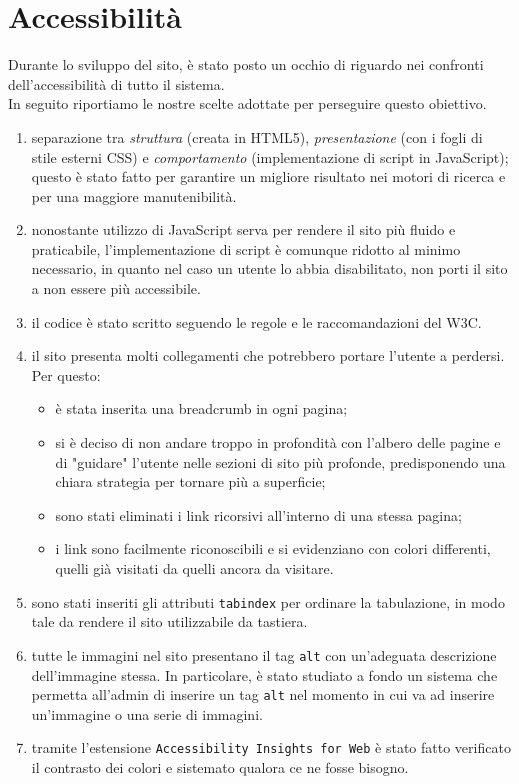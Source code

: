 \section{Accessibilità}
Durante lo sviluppo del sito, è stato posto un occhio di riguardo nei confronti dell'accessibilità di tutto il sistema.\\In seguito riportiamo le nostre scelte adottate per perseguire questo obiettivo.
\begin{enumerate}
	\item separazione tra \textit{struttura} (creata in HTML5), \textit{presentazione} (con i fogli di stile esterni CSS) e \textit{comportamento} (implementazione di script in JavaScript); \\questo è stato fatto per garantire un migliore risultato nei motori di ricerca e per una maggiore manutenibilità.
	
	\item nonostante utilizzo di JavaScript serva per rendere il sito più fluido e praticabile, l'implementazione di script è comunque ridotto al minimo necessario, in quanto nel caso un utente lo abbia disabilitato, non porti il sito a non essere più accessibile.
	\item il codice è stato scritto seguendo le regole e le raccomandazioni del W3C.
	\item il sito presenta molti collegamenti che potrebbero portare l'utente a perdersi. Per questo: 
	\begin{itemize}
	\item è stata inserita una breadcrumb in ogni pagina;
	\item si è deciso di non andare troppo in profondità con l'albero delle pagine e di "guidare" l'utente nelle sezioni di sito più profonde, predisponendo una chiara strategia per tornare più a superficie;
	\item sono stati eliminati i link ricorsivi all'interno di una stessa pagina;
	\item i link sono facilmente riconoscibili e si evidenziano con colori differenti, quelli già visitati da quelli ancora da visitare.
	\end{itemize}	
	\item sono stati inseriti gli attributi \texttt{tabindex} per ordinare la tabulazione, in modo tale da rendere il sito utilizzabile da tastiera.
	\item tutte le immagini nel sito presentano il tag \texttt{alt} con un'adeguata descrizione dell'immagine stessa. In particolare, è stato studiato a fondo un sistema che permetta all'admin di inserire un tag \texttt{alt} nel momento in cui va ad inserire un'immagine o una serie di immagini.
	\item tramite l'estensione \texttt{Accessibility Insights for Web} è stato fatto verificato il contrasto dei colori e sistemato qualora ce ne fosse bisogno.
\end{enumerate}
